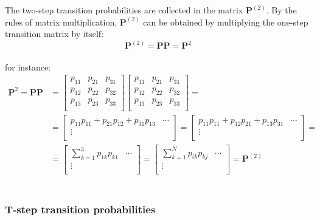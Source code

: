 \documentclass[\main/main.tex]{subfiles}
\begin{document}
\noindent The two-step transition probabilities are collected in the matrix $\mathbf{P}^{(2)}$. By the rules of matrix multiplication,  $\mathbf{P}^{(2)}$ can be obtained by multiplying the one-step transition matrix by itself:
\begin{equation}
    \mathbf{P}^{(2)} = \mathbf{P} \mathbf{P} = \mathbf{P}^2 
\end{equation}\\
for instance:
\begin{equation}
\begin{split}
  \mathbf{P}^2 = \mathbf{P} \mathbf{P} &= 
\begin{bmatrix}
p_{11} & p_{21} & p_{31} \\
p_{12} & p_{22} & p_{32}  \\
p_{13} & p_{23} & p_{33}  \\
\end{bmatrix}
\begin{bmatrix}
p_{11} & p_{21} & p_{31} \\
p_{12} & p_{22} & p_{32}  \\
p_{13} & p_{23} & p_{33}  \\
\end{bmatrix}=\\
&= 
\begin{bmatrix}
p_{11}p_{11} + p_{21}p_{12} + p_{31}p_{13} & \cdots \\
\vdots\\
\end{bmatrix} =
\begin{bmatrix}
p_{11}p_{11} + p_{12}p_{21} + p_{13}p_{31} & \cdots \\
\vdots\\
\end{bmatrix} =\\
&= 
\begin{bmatrix}
\sum_{k=1}^3 p_{1k}p_{k1} & \cdots\\
\vdots\\
\end{bmatrix} = 
\begin{bmatrix}
\sum_{k=1}^N p_{ik}p_{kj} & \cdots\\
\vdots\\
\end{bmatrix} = 
\mathbf{P}^{(2)} 
\end{split}
\end{equation}\\




\subsubsection{T-step transition probabilities }
\end{document}

